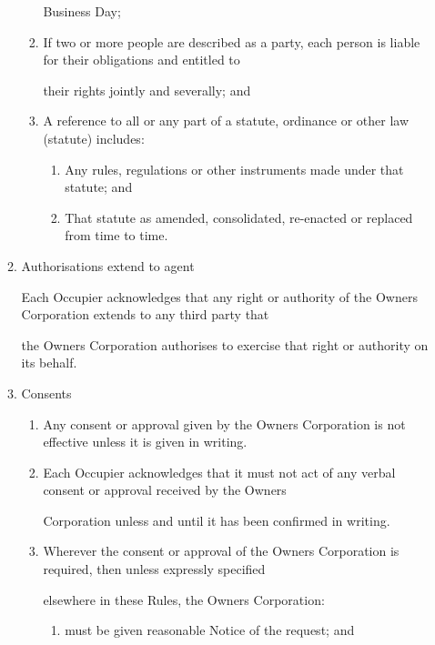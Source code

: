 \documentclass{article}
\begin{document}
\begin{enumerate}[label=\arabic*.]
\begin{enumerate}[label=\arabic{enumi}.\arabic*.]
\begin{enumerate}[label=(\arabic*)]
Business Day; 

\item  If two or more people are described as a party, each person is liable for their obligations and entitled to 

their rights jointly and severally; and 

\item  A reference to all or any part of a statute, ordinance or other law (statute) includes: 

\begin{enumerate}[label=(\alph*)]
\item  Any rules, regulations or other instruments made under that statute; and 

\item  That statute as amended, consolidated, re-enacted or replaced from time to time. 

\end{enumerate}
\end{enumerate}
\item  Authorisations extend to agent 

Each Occupier acknowledges that any right or authority of the Owners Corporation extends to any third party that 

the Owners Corporation authorises to exercise that right or authority on its behalf. 

\newpage

\item  Consents 

\begin{enumerate}[label=(\arabic*)]
\item  Any consent or approval given by the Owners Corporation is not effective unless it is given in writing. 

\item  Each Occupier acknowledges that it must not act of any verbal consent or approval received by the Owners 

Corporation unless and until it has been confirmed in writing. 

\item  Wherever the consent or approval of the Owners Corporation is required, then unless expressly specified 

elsewhere in these Rules, the Owners Corporation: 

\begin{enumerate}[label=(\alph*)]
\item  must be given reasonable Notice of the request; and 


\end{enumerate}
\end{enumerate}
\end{enumerate}
\end{enumerate}
\end{document}
